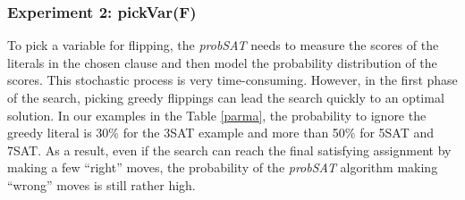 \documentclass[12pt,a4paper,twoside]{scrartcl}
\numberwithin{equation}{section}
\begin{document}
\subsubsection{Experiment 2: pickVar(F)} 
\label{sec:Experiment 2} 
To pick a variable for flipping, the \emph{probSAT} needs to measure the scores of the literals in the chosen clause and then model the probability distribution of the scores. This stochastic process is very time-consuming. However, in the first phase of the search, picking greedy flippings can lead the search quickly to an optimal solution. In our examples in the Table \ref{parma}, the probability to ignore the greedy literal is 30\% for the 3SAT example and more than  50\% for 5SAT and 7SAT.  As a result, even if the search can reach the final satisfying assignment by making a few ``right'' moves, the probability of the \emph{probSAT} algorithm making ``wrong'' moves is still rather high. \\
\end{document}
